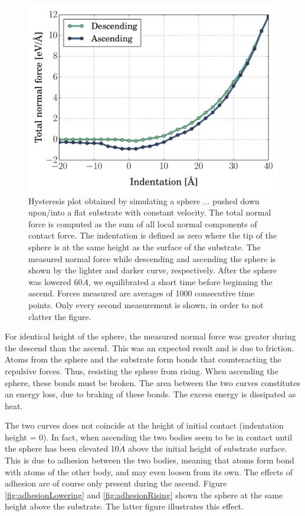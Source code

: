 \documentclass[twoside,english]{uiofysmaster}
\begin{document}
\begin{figure}[H]
\centering
\includegraphics[width=0.7\linewidth]{figures/hysteresis/normal2}
\caption{
	Hysteresis plot obtained by simulating a sphere ... pushed down upon/into a flat substrate with constant velocity. 
	The total normal force is computed as the sum of all local normal components of contact force. The indentation is defined as zero where the tip of the sphere is at the same height as the surface of the substrate.
	The measured normal force while descending and ascending the sphere is shown by the lighter and darker curve, respectively. 
	After the sphere was lowered 60$\mathring{A}$, we equilibrated a short time before beginning the ascend.	
	Forces measured are averages of 1000 consecutive time points.
	Only every second measurement is shown, in order to not clatter the figure.  
	 }
\label{fig:hysteresis}
\end{figure}

\noindent
For identical height of the sphere, the measured normal force was greater during the descend than the ascend. 
This was an expected result and is due to friction. %
Atoms from the sphere and the substrate form bonds that counteracting the repulsive forces. 
Thus, resisting the sphere from rising. 
When ascending the sphere, these bonds must be broken.
The area between the two curves constitutes an energy loss, due to braking of these bonds.
The excess energy is dissipated as heat.

The two curves does not coincide at the height of initial contact (indentation height = 0). 
In fact, when ascending the two bodies seem to be in contact until the sphere has been elevated 10$\mathring{A}$ above the initial height of substrate surface. 
This is due to adhesion between the two bodies, meaning that atoms form bond with atoms of the other body, and may even loosen from its own. The effects of adhesion are of course only present during the ascend. Figure \ref{fig:adhesionLowering} and \ref{fig:adhesionRising} shown the sphere at the same height above the substrate. The latter figure illustrates this effect.
\end{document}
